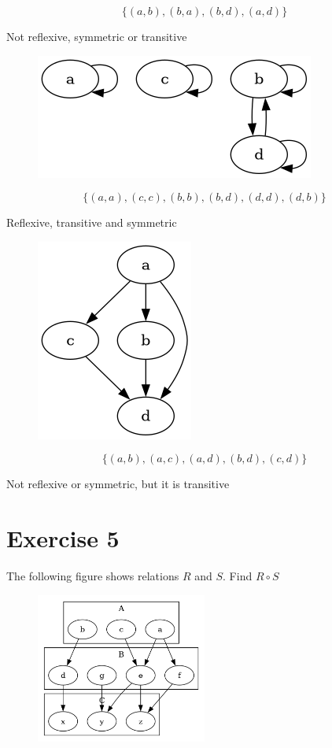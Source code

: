 \documentclass[11pt]{article}
\begin{document}
$$\{ (a, b), (b,a), (b,d), (a,d)\}$$

Not reflexive, symmetric or transitive

\begin{figure}[H]
\includegraphics[height=0.25\textheight]{4_3_images/4_3_4c.png}
\end{figure}

$$\{(a,a), (c,c), (b,b), (b,d), (d,d), (d,b)\}$$

Reflexive, transitive and symmetric

\begin{figure}[H]
\includegraphics[height=0.25\textheight]{4_3_images/4_3_4d.png}
\end{figure}

$$\{(a,b), (a,c), (a,d), (b,d), (c,d)\}$$

Not reflexive or symmetric, but it is transitive

\section*{Exercise 5}

The following figure shows relations $R$ and $S$. Find $R \circ S$

\begin{figure}[H]
\includegraphics[width=0.5\textwidth]{4_3_images/4_3_5.png}
\end{figure}
\end{document}
